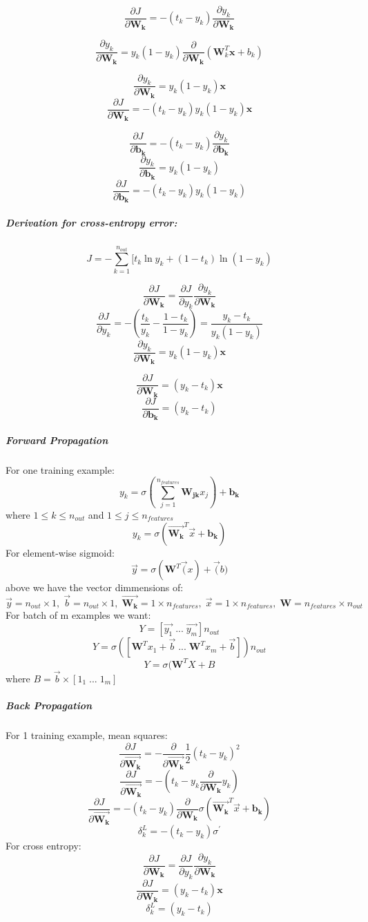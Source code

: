 \documentclass{article}
\begin{document}
$$\dfrac{\partial{J}}{\partial{\mathbf{W_k}}} = -(t_k - y_k) \dfrac{\partial{y_k}}{\partial{\mathbf{W_k}}}$$

$$\dfrac{\partial{y_k}}{\partial{\mathbf{W_k}}} = y_k(1 - y_k)\dfrac{\partial}{\partial{\mathbf{W_k}}}(\mathbf{W}_k^T \mathbf{x} + b_k)$$

$$\dfrac{\partial{y_k}}{\partial{\mathbf{W_k}}} = y_k(1 - y_k)\mathbf{x}$$
$$\dfrac{\partial{J}}{\partial{\mathbf{W_k}}} = -(t_k - y_k)y_k(1 - y_k)\mathbf{x}$$


$$\dfrac{\partial{J}}{\partial{\mathbf{b_k}}} = -(t_k - y_k) \dfrac{\partial{y_k}}{\partial{\mathbf{b_k}}}$$
$$\dfrac{\partial{y_k}}{\partial{\mathbf{b_k}}} = y_k(1 - y_k)$$
$$\dfrac{\partial{J}}{\partial{\mathbf{b_k}}} = -(t_k - y_k)y_k(1 - y_k)$$

\subparagraph{Derivation for cross-entropy error:}
$$J = -\sum_{k=1}^{n_{out}}[t_k \ln{y_k} + (1-t_k)\ln{(1-y_k)}$$

$$\dfrac{\partial{J}}{\partial{\mathbf{W_k}}} = \dfrac{\partial{J}}{\partial{y_k}} \dfrac{\partial{y_k}}{\partial{\mathbf{W_k}}}$$
$$\dfrac{\partial{J}}{\partial{y_k}} = -(\frac{t_k}{y_k} - \frac{1 - t_k}{1 - y_k}) = \frac{y_k - t_k}{y_k (1 - y_k)}$$
$$\dfrac{\partial{y_k}}{\partial{\mathbf{W_k}}} = y_k (1 - y_k) \mathbf{x}$$

$$\dfrac{\partial{J}}{\partial{\mathbf{W_k}}} = (y_k - t_k) \mathbf{x}$$
$$\dfrac{\partial{J}}{\partial{\mathbf{b_k}}} = (y_k - t_k)$$

\subparagraph{Forward Propagation}
For one training example:
$$y_k = {\sigma}(\sum_{j=1}^{n_{features}}{\mathbf{W_{jk}}}x_j) + {\mathbf{b_k}}$$
where $1\leq k \leq n_{out}$ and $1 \leq j \leq n_{features}$
$$y_k = \sigma(\vec{\mathbf{W_k}}^T\vec{x} + {\mathbf{b_k}})$$
For element-wise sigmoid:
$$\vec{y} = \sigma(\mathbf{W}^T\vec(x) + \vec(b)$$
above we have the vector dimmensions of:
$$\vec{y} = n_{out}\times 1, \; \vec{b} = n_{out}\times 1, \;  \vec{\mathbf{W_k}} = 1\times n_{features}, \; \vec{x} = 1\times n_{features}, \; \mathbf{W}=n_{features}\times n_{out}$$
For batch of m examples we want:
$$Y = [\vec{y_1} \; ... \; \vec{y_m}]n_{out}$$
$$Y = \sigma ([\mathbf{W}^Tx_1+\vec{b} \; ... \; \mathbf{W}^Tx_m + \vec{b}])n_{out}$$
$$Y = \sigma(\mathbf{W}^TX + B$$
where $B = \vec{b} \times [1_1 \; ... \; 1_m]$



\subparagraph{Back Propagation}
For 1 training example, mean squares:
$$\dfrac{\partial{J}}{\partial{\vec{\mathbf{W_k}}}} = -\dfrac{\partial}{\partial{\vec{\mathbf{W_k}}}}\dfrac{1}{2}(t_k - y_k)^2$$
$$\dfrac{\partial{J}}{\partial{\vec{\mathbf{W_k}}}} = -(t_k - y_k\dfrac{\partial}{\partial{\mathbf{W_k}}}y_k)$$
$$\dfrac{\partial{J}}{\partial{\vec{\mathbf{W_k}}}} = -(t_k - y_k)\dfrac{\partial}{\partial{\mathbf{W_k}}}\sigma (\vec{\mathbf{W_k}}^T\vec{x} + {\mathbf{b_k}})$$
$$\delta_k^L = -(t_k - y_k)\sigma ^{'}$$
For cross entropy:
$$\dfrac{\partial{J}}{\partial{\mathbf{W_k}}} = \dfrac{\partial{J}}{\partial{y_k}} \dfrac{\partial{y_k}}{\partial{\mathbf{W_k}}}$$
$$\dfrac{\partial{J}}{\partial{\mathbf{W_k}}} = (y_k - t_k) \mathbf{x}$$
$$\delta_k^L =  (y_k - t_k)$$
\end{document}
